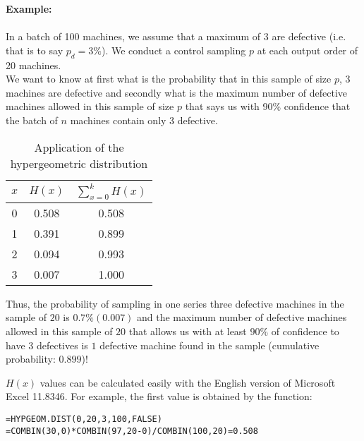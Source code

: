 	\begin{tcolorbox}[colframe=black,colback=white,sharp corners]
\textbf{{\Large {}}Example:}\\\\
In a batch of 100 machines, we assume that a maximum of 3 are defective (i.e. that is to say $p_d=3\%$). We conduct a control sampling $p$ at each output order of 20 machines.\\

We want to know at first what is the probability that in this sample of size $p$, 3 machines are defective and secondly what is the maximum number of defective machines allowed in this sample of size $p$ that says us with 90\% confidence that the batch of $n$ machines contain only 3 defective.

	\begin{table}[H]
	\begin{center}
			\begin{tabular}{|c|c|c|}
				\hline
				\multicolumn{1}{c}{\cellcolor{black!30}$x$} & 
  \multicolumn{1}{c}{\cellcolor{black!30}$H(x)$} & 
  \multicolumn{1}{c}{\cellcolor{black!30}$\displaystyle\sum_{x=0}^k H(x)$} \\ \hline
				 0 & 0.508 & 0.508 \\ \hline
				 1 & 0.391 & 0.899 \\ \hline
				 2 & 0.094 & 0.993 \\ \hline
				 3 & 0.007 & 1.000 \\ \hline
		\end{tabular}
	\end{center}
	\caption[]{Application of the hypergeometric distribution}
	\end{table}
	Thus, the probability of sampling in one series three defective machines in the sample of $20$ is $0.7\% (0.007)$ and the maximum number of defective machines allowed in this sample of $20$ that allows us with at least $90\%$ of confidence to have $3$ defectives is $1$ defective machine found in the sample (cumulative probability: $0.899$)!

	$H(x)$ values can be calculated easily with the English version of Microsoft Excel 11.8346. For example, the first value is obtained by the function:
	\begin{center}
	\texttt{=HYPGEOM.DIST(0,20,3,100,FALSE)\\=COMBIN(30,0)*COMBIN(97,20-0)/COMBIN(100,20)=0.508}
	\end{center}
	\end{tcolorbox}
	
